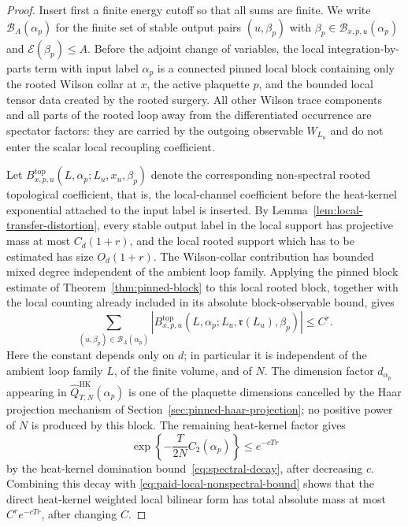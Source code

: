 \documentclass[11pt,a4paper,reqno]{amsart}
\theoremstyle{definition}
\theoremstyle{remark}
\newcommand\HK{{\mathrm{HK}}}
\begin{document}
\begin{proof}
Insert first a finite energy cutoff so that all sums are finite.  We write
$\mathcal B_A(\alpha_p)$ for the finite set of stable output pairs
$(u,\beta_p)$ with $\beta_p\in\mathcal B_{x,p,u}(\alpha_p)$ and $\mathcal E(\beta_p)\le A$.  Before the adjoint change of variables, the local integration-by-parts term with input label $\alpha_p$ is a connected pinned local block containing only the rooted Wilson collar at $x$, the active plaquette $p$, and the bounded local tensor data created by the rooted surgery. All other Wilson trace components and all parts of the rooted loop away from the differentiated occurrence are spectator factors: they are carried by the outgoing observable $W_{L_u}$ and do not enter the scalar local recoupling coefficient.

Let $B^{\mathrm{top}}_{x,p,u}(L,\alpha_p;L_u,x_u,\beta_p)$ denote the corresponding non-spectral rooted topological coefficient, that is, the local-channel coefficient before the heat-kernel exponential attached to the input label is inserted. By Lemma~\ref{lem:local-transfer-distortion}, every stable output label in the local support has projective mass at most $C_d(1+r)$, and the local rooted support which has to be estimated has size $O_d(1+r)$. The Wilson-collar contribution has bounded mixed degree independent of the ambient loop family. Applying the pinned block estimate of Theorem~\ref{thm:pinned-block} to this local rooted block, together with the local counting already included in its absolute block-observable bound, gives
\begin{equation}\label{eq:paid-local-nonspectral-bound}
\sum_{(u,\beta_p)\in\mathcal B_A(\alpha_p)}
\left|B^{\mathrm{top}}_{x,p,u}(L,\alpha_p;L_u,\mathfrak r(L_u),\beta_p)\right|
\le C^r .
\end{equation}
Here the constant depends only on $d$; in particular it is independent of the ambient loop family $L$, of the finite volume, and of $N$. The dimension factor $d_{\alpha_p}$ appearing in
$\widehat Q^\HK_{T,N}(\alpha_p)$ is one of the plaquette dimensions cancelled
by the Haar projection mechanism of Section~\ref{sec:pinned-haar-projection}; no
positive power of $N$ is produced by this block.  The remaining heat-kernel
factor gives
\[
\exp\left\{-\frac{T}{2N}C_2(\alpha_p)\right\}
\le e^{-cTr}
\]
by the heat-kernel domination bound~\eqref{eq:spectral-decay}, after
decreasing $c$.  Combining this decay with
\eqref{eq:paid-local-nonspectral-bound} shows that the direct heat-kernel
weighted local bilinear form has total absolute mass at most
$C^r e^{-cTr}$, after changing $C$.


\end{proof}
\end{document}
